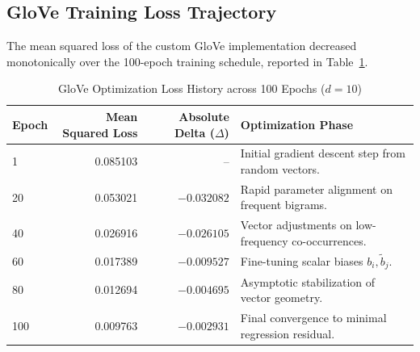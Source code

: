 \subsection{GloVe Training Loss Trajectory}
The mean squared loss of the custom GloVe implementation decreased monotonically over the 100-epoch training schedule, reported in Table~\ref{tab:exp6_loss_history}.
\begin{table}[H]
\centering
\small
\caption{GloVe Optimization Loss History across 100 Epochs ($d=10$)}
\label{tab:exp6_loss_history}
\begin{tabular}{lrrp{6.5cm}}
\toprule
\textbf{Epoch} & \textbf{Mean Squared Loss} & \textbf{Absolute Delta ($\Delta$)} & \textbf{Optimization Phase} \\
\midrule
1 & 0.085103 & -- & Initial gradient descent step from random vectors. \\
20 & 0.053021 & $-0.032082$ & Rapid parameter alignment on frequent bigrams. \\
40 & 0.026916 & $-0.026105$ & Vector adjustments on low-frequency co-occurrences. \\
60 & 0.017389 & $-0.009527$ & Fine-tuning scalar biases $b_i, \tilde{b}_j$. \\
80 & 0.012694 & $-0.004695$ & Asymptotic stabilization of vector geometry. \\
100 & 0.009763 & $-0.002931$ & Final convergence to minimal regression residual. \\
\bottomrule
\end{tabular}
\end{table}

